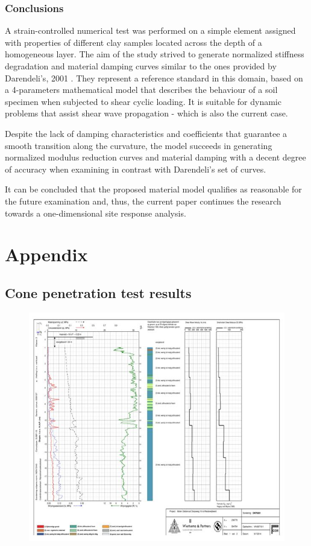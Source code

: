 \documentclass[12pt,a4paper]{report}
\begin{document}
\newpage
\section{Conclusions}
A strain-controlled numerical test was performed on a simple element assigned with properties of different clay samples located across the depth of a homogeneous layer. The aim of the study strived to generate normalized stiffness degradation and material damping curves similar to the ones provided by Darendeli's, 2001 \cite{darendeli2001development}. They represent a reference standard in this domain, based on a 4-parameters mathematical model that describes the behaviour of a soil specimen when subjected to shear cyclic loading. It is suitable for dynamic problems that assist shear wave propagation - which is also the current case.

Despite the lack of damping characteristics and coefficients that guarantee a smooth transition along the curvature, the model succeeds in generating normalized modulus reduction curves and material damping with a decent degree of accuracy when examining in contrast with Darendeli's set of curves.  

It can be concluded that the proposed material model qualifies as reasonable for the future examination and, thus, the current paper continues the research towards a one-dimensional site response analysis. 




\newpage
\appendix
{}
\part{Appendix}
\chapter{Cone penetration test results} \label{App:AppendixA}

\begin{figure}[h!]
	\centering
	\includegraphics[width=0.85\linewidth]{"cpt"}
\end{figure}
\end{document}
